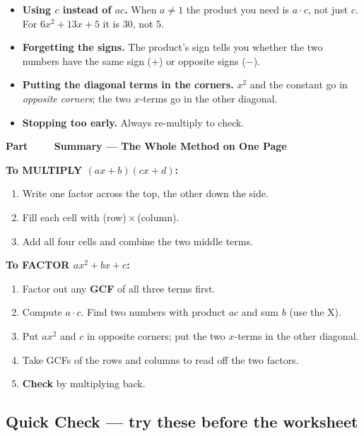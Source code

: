 \documentclass[11pt]{article}
\newcounter{partnum}
\newcommand{\partbanner}[1]{%
  \stepcounter{partnum}%
  \vspace{8pt}\par\noindent
  \begin{tcolorbox}[colback=primary,colframe=primary,arc=2pt,
    left=10pt,right=10pt,top=5pt,bottom=5pt,boxrule=0pt]
  {\color{accent}\bfseries Part \thepartnum\ \ \textbullet\ \ }{\color{white}\bfseries\large #1}
  \end{tcolorbox}\par\vspace{3pt}}
\begin{document}
\begin{warnbox}
\begin{itemize}[nosep,leftmargin=1.4em]
\item \textbf{Using $c$ instead of $ac$.} When $a \neq 1$ the product you need is $a\cdot c$,
not just $c$. For $6x^2+13x+5$ it is $30$, not $5$.
\item \textbf{Forgetting the signs.} The product's sign tells you whether the two numbers have the
same sign ($+$) or opposite signs ($-$).
\item \textbf{Putting the diagonal terms in the corners.} $x^2$ and the constant go in
\emph{opposite corners}; the two $x$-terms go in the other diagonal.
\item \textbf{Stopping too early.} Always re-multiply to check.
\end{itemize}
\end{warnbox}

\newpage
\partbanner{Summary --- The Whole Method on One Page}

\begin{keybox}
\textbf{To MULTIPLY $(ax+b)(cx+d)$:}
\begin{enumerate}[nosep,leftmargin=1.6em]
\item Write one factor across the top, the other down the side.
\item Fill each cell with (row)\,$\times$\,(column).
\item Add all four cells and combine the two middle terms.
\end{enumerate}
\medskip

\textbf{To FACTOR $ax^2+bx+c$:}
\begin{enumerate}[nosep,leftmargin=1.6em]
\item Factor out any \textbf{GCF} of all three terms first.
\item Compute $a\cdot c$. Find two numbers with product $ac$ and sum $b$ (use the X).
\item Put $ax^2$ and $c$ in opposite corners; put the two $x$-terms in the other diagonal.
\item Take GCFs of the rows and columns to read off the two factors.
\item \textbf{Check} by multiplying back.
\end{enumerate}
\end{keybox}

\vspace{6pt}
\subsection*{Quick Check --- try these before the worksheet}
\end{document}
